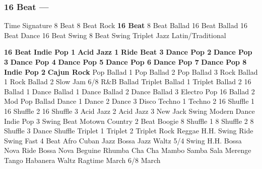 \subsubsection[16 Beat]{16 Beat --- \UiKey{\II}\UiKey{\MET}}
Time Signature
8 Beat
8 Beat Rock
\textbf{16 Beat}
8 Beat Ballad
16 Beat Ballad
16 Beat Dance
16 Beat Swing
8 Beat Swing
Triplet
Jazz
Latin/Traditional





























\textbf{16 Beat}
\textbf{Indie Pop 1}
\textbf{Acid Jazz 1}
\textbf{Ride Beat 3}
\textbf{Dance Pop 2}
\textbf{Dance Pop 3}
\textbf{Dance Pop 4}
\textbf{Dance Pop 5}
\textbf{Dance Pop 6}
\textbf{Dance Pop 7}
\textbf{Dance Pop 8}
\textbf{Indie Pop 2}
\textbf{Cajun Rock}
Pop Ballad 1
Pop Ballad 2
Pop Ballad 3
Rock Ballad 1
Rock Ballad 2
Slow Jam
6/8 R\&B Ballad
Triplet Ballad 1
Triplet Ballad 2
16 Ballad 1
Dance Ballad 1
Dance Ballad 2
Dance Ballad 3
Electro Pop
16 Ballad 2
Mod Pop Ballad
Dance 1
Dance 2
Dance 3
Disco
Techno 1
Techno 2
16 Shuffle 1
16 Shuffle 2
16 Shuffle 3
Acid Jazz 2
Acid Jazz 3
New Jack Swing
Modern Dance
Indie Pop 3
Swing Beat
Motown
Country 2 Beat
Boogie
8 Shuffle 1
8 Shuffle 2
8 Shuffle 3
Dance Shuffle
Triplet 1
Triplet 2
Triplet Rock
Reggae
H.H. Swing
Ride Swing
Fast 4 Beat
Afro Cuban
Jazz Bossa
Jazz Waltz
5/4 Swing
H.H. Bossa Nova
Ride Bossa Nova
Beguine
Rhumba
Cha Cha
Mambo
Samba
Sala
Merenge
Tango
Habanera
Waltz
Ragtime
March
6/8 March

